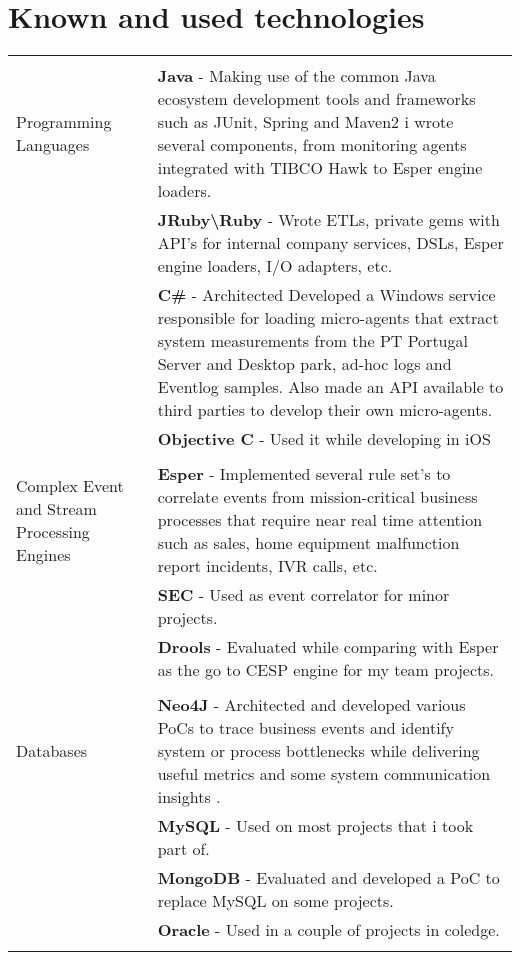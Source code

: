 \documentclass[a4paper,10pt]{article}
\begin{document}
\section{Known and used technologies}
\begin{tabular}{p{4cm}|p{9cm}}
\multicolumn{2}{c}{} \\
	Programming Languages
	& {\bf Java} - Making use of the common Java ecosystem development tools and frameworks such as JUnit, Spring and Maven2 i wrote several components, from monitoring agents
	 integrated with TIBCO Hawk to Esper engine loaders.  \\
	& {\bf JRuby\textbackslash Ruby} - Wrote ETLs, private gems with API's for internal company services, DSLs, Esper engine loaders, I/O adapters, etc.\\
	& {\bf C\# } - Architected Developed a Windows service responsible for loading micro-agents that extract system measurements from the PT Portugal Server and Desktop park, ad-hoc logs and Eventlog samples.
	Also made an API available to third parties to develop their own micro-agents.\\
	& {\bf Objective C} - Used it while developing in iOS\\
\multicolumn{2}{c}{} \\
	Complex Event and Stream Processing Engines
	& {\bf Esper} - Implemented several rule set's to correlate events from mission-critical business processes that require near real time attention such as sales, home equipment malfunction report incidents, IVR calls, etc.\\
	& {\bf SEC} - Used as event correlator for minor projects. \\
	& {\bf Drools} - Evaluated while comparing with Esper as the go to CESP engine for my team projects. \\
\multicolumn{2}{c}{} \\
	Databases
	& {\bf Neo4J} - Architected and developed various PoCs to trace business events and identify system or process bottlenecks while delivering useful metrics and some system communication insights .\\ 
	& {\bf MySQL} - Used on most projects that i took part of. \\
	& {\bf MongoDB} - Evaluated and developed a PoC to replace MySQL on some projects. \\
	& {\bf Oracle} - Used in a couple of projects in coledge.\\
\multicolumn{2}{c}{} \\

\end{tabular}
\end{document}
